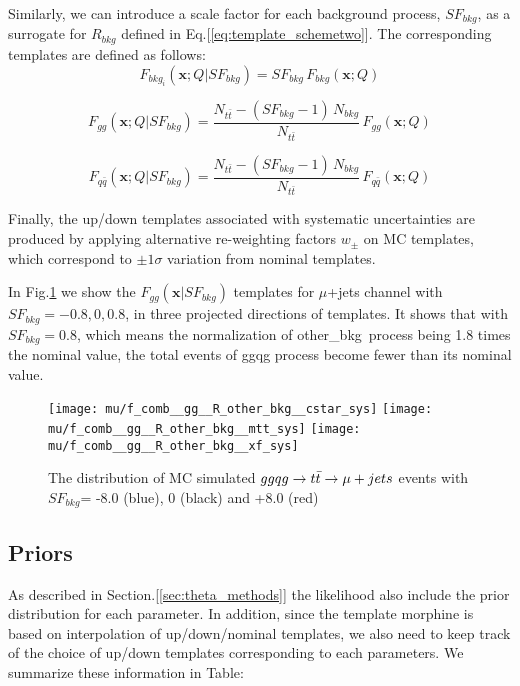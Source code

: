 \documentclass{cmspaperpdf}
\begin{document}
Similarly, we can introduce a scale factor for each background process, $SF_{bkg}$, as a surrogate for $R_{bkg}$ defined in Eq.[\ref{eq:template_schemetwo}]. The corresponding templates are defined as follows:
\begin{equation}
\label{eq:SF_bkg}
F_{bkg_i}(\bm{x};Q|SF_{bkg}) = SF_{bkg}\,F_{bkg}(\bm x ;Q) 
\end{equation}

\begin{equation}
F_{gg}(\bm{x};Q|SF_{bkg}) = \frac{N_{t\bar{t}}-(SF_{bkg}-1)\,N_{bkg}}{N_{t\bar{t}}}\,F_{gg}(\bm{x};Q)
\end{equation}

\begin{equation}
F_{q\bar{q}}(\bm{x};Q|SF_{bkg}) = \frac{N_{t\bar{t}}-(SF_{bkg}-1)\,N_{bkg}}{N_{t\bar{t}}}\,F_{q\bar{q}}(\bm{x};Q)
\end{equation}

Finally, the up/down templates associated with systematic uncertainties are produced by applying alternative re-weighting factors $w_{\pm}$ on MC templates, which correspond to $\pm 1 \sigma$ variation from nominal templates. 

In Fig.\ref{fig:gg_SF_bkg_templates} we show the $F_{gg}(\bm{x}|SF_{bkg})$ templates for $\mu$+jets channel with $SF_{bkg}= -0.8,0,0.8$, in three projected directions of templates. It shows that with $SF_{bkg}=0.8$, which means the normalization of other\_bkg\ process being 1.8 times the nominal value, the total events of gg\/qg process become fewer than its nominal value. 

\begin{figure}[hbt]
  \begin{center}
    \texttt{[image: mu/f\_comb\_\_gg\_\_R\_other\_bkg\_\_cstar\_sys]}
    \texttt{[image: mu/f\_comb\_\_gg\_\_R\_other\_bkg\_\_mtt\_sys]}
    \texttt{[image: mu/f\_comb\_\_gg\_\_R\_other\_bkg\_\_xf\_sys]}

  \caption{\small The distribution of MC simulated $gg\/qg\rightarrow t\bar{t}\rightarrow \mu+jets$ events with $SF_{bkg}$= -8.0 (blue), 0 (black) and +8.0 (red)}
    \label{fig:gg_SF_bkg_templates}
  \end{center}
\end{figure}



\subsection{Priors}
As described in Section.[\ref{sec:theta_methods}] the likelihood also include the prior distribution for each parameter. In addition, since the template morphine is based on interpolation of up/down/nominal templates, we also need to keep track of the choice of up/down templates corresponding to each parameters. We summarize these information in Table:
\end{document}

